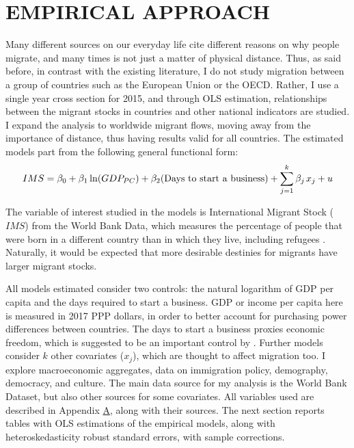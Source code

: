 \documentclass[../main.tex]{subfiles}
\begin{document}
\section{EMPIRICAL APPROACH}
Many different sources on our everyday life cite different reasons on why people migrate, and many times is not just a matter of physical distance. Thus, as said before, in contrast with the existing literature, I do not study migration between a group of countries such as the European Union or the OECD. Rather, I use a single year cross section for 2015, and through OLS estimation, relationships between the migrant stocks in countries and other national indicators are studied. I expand the analysis to worldwide migrant flows, moving away from the importance of distance, thus having results valid for all countries. The estimated models part from the following general functional form: 
\begin{equation}
    IMS=\beta_0+\beta_1 \ln(GDP_{PC}) + \beta_2 (\text{Days to start a business})+ \sum_{j=1}^k \beta_j\hspace{0.05cm} x_j+u
    \label{eqn:1}
\end{equation}

The variable of interest studied in the models is International Migrant Stock ($IMS$) from the World Bank Data, which measures the percentage of people that were born in a different country than in which they live, including refugees \parencite{WorldBankGroup.2020}. Naturally, it would be expected that more desirable destinies for migrants have larger migrant stocks.

All models estimated consider two controls: the natural logarithm of GDP per capita and the days required to start a business. GDP or income per capita here is measured in 2017 PPP dollars, in order to better account for purchasing power differences between countries. The days to start a business proxies economic freedom, which is suggested to be an important control by \textcite{Prada.2020}. Further models consider $k$ other covariates ($x_j$), which are thought to affect migration too. I explore macroeconomic aggregates, data on immigration policy, demography, democracy, and culture. The main data source for my analysis is the World Bank Dataset, but also other sources for some covariates. All variables used are described in Appendix \hyperref[sec:A]{A}, along with their sources. The next section reports tables with OLS estimations of the empirical models, along with heteroskedasticity robust standard errors, with sample corrections.  
\end{document}
